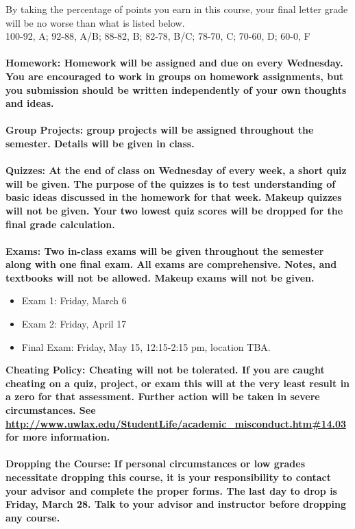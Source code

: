 \documentclass [10pt]{article}
\begin{document}
By taking the percentage of points you earn in this course, your final letter grade will be no worse than what is listed below. \\
100-92, A; 92-88, A/B; 88-82, B; 82-78, B/C; 78-70, C; 70-60, D; 60-0, F \\ 
\ \\
\bfseries Homework: \normalfont Homework will be assigned and due on every Wednesday. You are encouraged to work in groups on homework assignments, but you submission should be written independently of your own thoughts and ideas.\\
\ \\
\bfseries Group Projects:  group projects will be assigned throughout the semester. Details will be given in class. \\
\ \\
\bfseries Quizzes: \normalfont At the end of class on Wednesday of every week, a short quiz will be given. The purpose of the quizzes is to test understanding of basic ideas discussed in the homework for that week. Makeup quizzes will not be given. Your two lowest quiz scores will be dropped for the final grade calculation. \\
\ \\
\bfseries Exams: \normalfont Two in-class exams will be given throughout the semester along with one final exam. All exams are comprehensive. Notes, and textbooks will not be allowed. Makeup exams will not be given.  \vspace{-3mm} 
\begin {itemize}
\setlength{\itemsep}{1pt}
\setlength{\parskip}{0pt}
\setlength{\parsep}{0pt}
\item Exam 1: Friday, March 6
\item Exam 2: Friday, April 17
\item Final Exam: Friday, May 15, 12:15-2:15 pm, location TBA.
\end{itemize}
\bfseries Cheating Policy: \normalfont Cheating will not be tolerated. If you are caught cheating on a quiz, project, or exam this will at the very least result in a zero for that assessment. Further action will be taken in severe circumstances. See \url{ http://www.uwlax.edu/StudentLife/academic_misconduct.htm#14.03} for more information.\\
\ \\
\bfseries Dropping the Course: \normalfont If personal circumstances or low grades necessitate dropping this course, it is your responsibility to contact your advisor and complete the proper forms. The last day to drop is Friday, March 28. Talk to your advisor and instructor before dropping any course. \\
\end{document}
